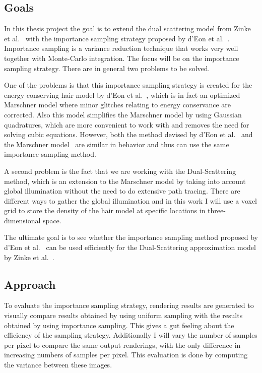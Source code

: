 \documentclass[11pt,a4paper]{report}
\begin{document}
\subsection*{Goals}
In this thesis project the goal is to extend the dual scattering model from Zinke et al.~\cite{zinke} with the importance sampling strategy proposed by d'Eon et al.~\cite{eon2013}. Importance sampling is a variance reduction technique that works very well together with Monte-Carlo integration. The focus will be on the importance sampling strategy. There are in general two problems to be solved.

One of the problems is that this importance sampling strategy is created for the energy conserving hair model by d'Eon et al.~\cite{eon2011}, which is in fact an optimized Marschner model where minor glitches relating to energy conservance are corrected. Also this model simplifies the Marschner model by using Gaussian quadratures, which are more convenient to work with and removes the need for solving cubic equations. However, both the method devised by d'Eon et al.~\cite{eon2011} and the Marschner model~\cite{marschner} are similar in behavior and thus can use the same importance sampling method.

A second problem is the fact that we are working with the Dual-Scattering method, which is an extension to the Marschner model by taking into account global illumination without the need to do extensive path tracing. There are different ways to gather the global illumination and in this work I will use a voxel grid to store the density of the hair model at specific locations in three-dimensional space.

The ultimate goal is to see whether the importance sampling method proposed by d'Eon et al.~\cite{eon2013} can be used efficiently for the Dual-Scattering approximation model by Zinke et al.~\cite{zinke}.

\subsection*{Approach}

To evaluate the importance sampling strategy, rendering results are generated to visually compare results obtained by using uniform sampling with the results obtained by using importance sampling. This gives a gut feeling about the efficiency of the sampling strategy. Additionally I will vary the number of samples per pixel to compare the same output renderings, with the only difference in increasing numbers of samples per pixel. This evaluation is done by computing the variance between these images.
\end{document}
